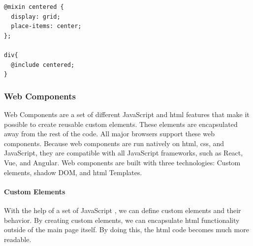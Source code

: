 \begin{lstlisting}[style=htmlcssjs]
@mixin centered {
  display: grid;
  place-items: center;
}; 

div{
  @include centered; 
}
\end{lstlisting}









\subsubsection{Web Components}%
\label{sub:Web Components}
Web Components are a set of different JavaScript  and \acrshort{html} features that make it possible to create reusable custom elements\cite{WebComponentsMDN}. These elements are encapsulated away from the rest of the code. All major browsers support these web components. Because web components are run natively on \acrshort{html}, \acrshort{css}, and JavaScript, they are compatible with all JavaScript frameworks, such as React, Vue, and Angular. Web components are built with three technologies: Custom elements, shadow DOM, and \acrshort{html} Templates. 

\paragraph{Custom Elements}
With the help of a set of JavaScript , we can define custom elements and their behavior. By creating custom elements, we can encapsulate \acrshort{html} functionality outside of the main page itself. By doing this, the \acrshort{html} code becomes much more readable. 

